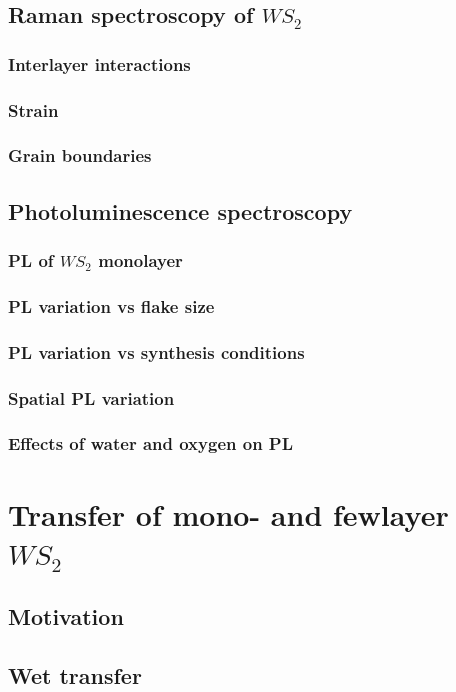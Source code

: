 \documentclass[12pt]{article}
\begin{document}
	\subsection{Raman spectroscopy of $WS_2$}
		\subsubsection{Interlayer interactions}
		\subsubsection{Strain}
		\subsubsection{Grain boundaries}
	\subsection{Photoluminescence spectroscopy}
		\subsubsection{PL of $WS_2$ monolayer}
		\subsubsection{PL variation vs flake size}
		\subsubsection{PL variation vs synthesis conditions}
		\subsubsection{Spatial PL variation}
		\subsubsection{Effects of water and oxygen on PL}
\section{Transfer of mono- and fewlayer $WS_2$}
	\subsection{Motivation}
	\subsection{Wet transfer}
\end{document}
